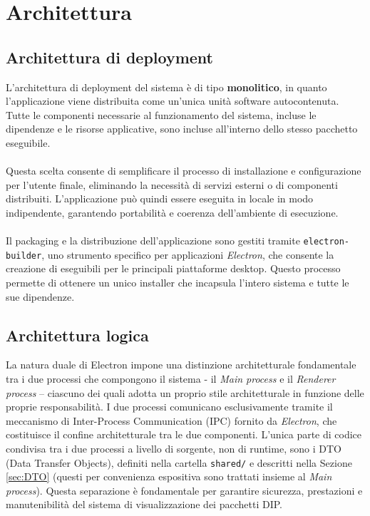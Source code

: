 \documentclass[a4paper,12pt]{article}
\begin{document}
    \section{Architettura} {
        \subsection{Architettura di deployment} {
            L’architettura di deployment del sistema è di tipo \textbf{monolitico}, in quanto l’applicazione viene distribuita come un’unica unità software autocontenuta. Tutte le componenti necessarie al funzionamento del sistema, incluse le dipendenze e le risorse applicative, sono incluse all’interno dello stesso pacchetto eseguibile.\\
            \\
            Questa scelta consente di semplificare il processo di installazione e configurazione per l’utente finale, eliminando la necessità di servizi esterni o di componenti distribuiti. L’applicazione può quindi essere eseguita in locale in modo indipendente, garantendo portabilità e coerenza dell’ambiente di esecuzione.\\
            \\
            Il packaging e la distribuzione dell’applicazione sono gestiti tramite \verb|electron-builder|, uno strumento specifico per applicazioni \textit{Electron}, che consente la creazione di eseguibili per le principali piattaforme desktop. Questo processo permette di ottenere un unico installer che incapsula l’intero sistema e tutte le sue dipendenze.
        }

        \subsection{Architettura logica} {
            La natura duale di Electron impone una distinzione architetturale fondamentale tra i due processi che compongono il sistema - il \textit{Main process} e il \textit{Renderer process} – ciascuno dei quali adotta un proprio stile architetturale in funzione delle proprie responsabilità.
            I due processi comunicano esclusivamente tramite il meccanismo di Inter-Process Communication (IPC) fornito da \textit{Electron}, che costituisce il confine architetturale tra le due componenti.
            L'unica parte di codice condivisa tra i due processi a livello di sorgente, non di runtime, sono i DTO (Data Transfer Objects), definiti nella cartella \verb|shared/| e descritti nella Sezione \ref{sec:DTO} (questi per convenienza espositiva sono trattati insieme al \textit{Main process}).
            Questa separazione è fondamentale per garantire sicurezza, prestazioni e manutenibilità del sistema di visualizzazione dei pacchetti DIP.
            
}}
\end{document}

